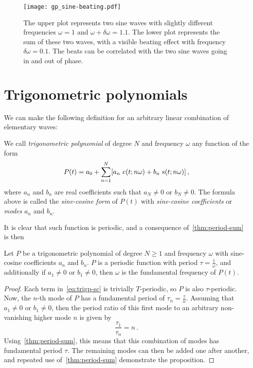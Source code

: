 \begin{figure}
  \centering
  \texttt{[image: gp\_sine-beating.pdf]}
  \caption{The upper plot represents two sine waves with slightly different frequencies $\omega=1$ and $\omega+\delta\omega=1.1$. The lower plot represents the sum of these two waves, with a visible beating effect with frequency $\delta\omega=0.1$. The beats can be correlated with the two sine waves going in and out of phase.}
  \label{fig:beating}
\end{figure}
\section{Trigonometric polynomials}
We can make the following definition for an arbitrary linear
combination of elementary waves:
\begin{definition}
  We call \emph{trigonometric polynomial} of degree $N$ and frequency $\omega$ any
  function of the form
  \begin{equation}
    P(t)=a_0+\sum_{n=1}^N[a_n\,\operatorname{c}(t;n\omega)+b_n\,\operatorname{s}(t;n\omega)]\,,
    \label{eq:trigp-sc}
  \end{equation}
  where $a_n$ and $b_n$ are real coefficients such that $a_N\neq 0$ or $b_N \neq 0$. The
  formula above is called the \emph{sine-cosine form} of $P(t)$ with \emph{sine-cosine
  coefficients} or \emph{modes} $a_n$ and $b_n$.
\end{definition}
It is clear that such function is periodic, and a consequence of~\cref{thm:period-sum} is
then
\begin{proposition}
  Let $P$ be a trigonometric polynomial of degree $N\geq 1$ and frequency $\omega$ with
  sine-cosine coefficients $a_n$ and $b_n$. $P$ is a periodic function with period
  $\tau=\frac{1}{\omega}$, and additionally if $a_1\neq0$ or $b_1\neq0$, then $\omega$ is the
  fundamental frequency of $P(t)$.
\end{proposition}
\begin{proof}
  Each term in~\cref{eq:trigp-sc} is trivially $T$-periodic, so $P$ is also $\tau$-periodic.
  Now, the $n$-th mode of $P$ has a fundamental period of $\tau_n=\frac{\tau}{n}$. Assuming that
  $a_1\neq0$ or $b_1\neq0$, then the period ratio of this first mode to an arbitrary
  non-vanishing higher mode $n$ is given by
  \begin{equation}
    \frac{\tau_1}{\tau_n}=n\,.
  \end{equation}
  Using~\cref{thm:period-sum}, this means that this combination of modes has fundamental
  period $\tau$. The remaining modes can then be added one after another, and repeated use
  of~\cref{thm:period-sum} demonstrate the proposition.
\end{proof}
